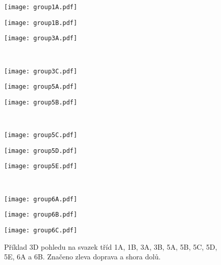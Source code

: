 \begin{figure}[htps]
\centering
\begin{minipage}[c]{0.325\textwidth}
\texttt{[image: group1A.pdf]}
\end{minipage}
\begin{minipage}[c]{0.325\textwidth}
\texttt{[image: group1B.pdf]}
\end{minipage}
\begin{minipage}[c]{0.325\textwidth}
\texttt{[image: group3A.pdf]}
\end{minipage}\\

\begin{minipage}[c]{0.325\textwidth}
\texttt{[image: group3C.pdf]}
\end{minipage}
\begin{minipage}[c]{0.325\textwidth}
\texttt{[image: group5A.pdf]}
\end{minipage}
\begin{minipage}[c]{0.325\textwidth}
\texttt{[image: group5B.pdf]}
\end{minipage}\\

\begin{minipage}[c]{0.325\textwidth}
\texttt{[image: group5C.pdf]}
\end{minipage}
\begin{minipage}[c]{0.325\textwidth}
\texttt{[image: group5D.pdf]}
\end{minipage}
\begin{minipage}[c]{0.325\textwidth}
\texttt{[image: group5E.pdf]}
\end{minipage}\\

\begin{minipage}[c]{0.325\textwidth}
\texttt{[image: group6A.pdf]}
\end{minipage}
\begin{minipage}[c]{0.325\textwidth}
\texttt{[image: group6B.pdf]}
\end{minipage}
\begin{minipage}[c]{0.325\textwidth}
\texttt{[image: group6C.pdf]}
\end{minipage}

\caption[Svazky třídy 1A-6B.]{Příklad 3D pohledu na svazek tříd 1A, 1B, 3A, 3B, 5A, 5B, 5C, 5D, 5E, 6A a 6B. Značeno zleva doprava a shora dolů.}
\label{fig:modelClass3D2}
\end{figure}



